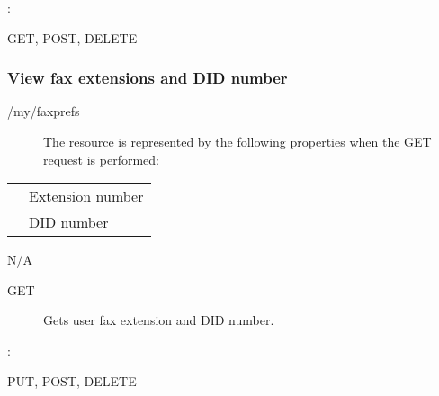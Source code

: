 \documentclass[letterpaper,10pt,english]{sphinxmanual}
\begin{document}
:

\begin{sphinxVerbatim}[commandchars=\\\{\}]
\end{sphinxVerbatim}

 GET, POST, DELETE


\subsubsection{View fax extensions and DID number}
\label{\detokenize{restapi:view-fax-extensions-and-did-number}}
 /my/faxprefs
\begin{description}
\item[{}] \leavevmode
The resource is represented by the following properties when the GET request is performed:

\end{description}


\begin{savenotes}\sphinxattablestart
\centering
\begin{tabulary}{\linewidth}[t]{|T|T|}
\hline

&
\\
\hline
{}
&
Extension number
\\
\hline
{}
&
DID number
\\
\hline
\end{tabulary}
\par
\sphinxattableend\end{savenotes}

 N/A
\begin{description}
\item[{ GET}] \leavevmode
Gets user fax extension and DID number.

\end{description}

:

\begin{sphinxVerbatim}[commandchars=\\\{\}]
\end{sphinxVerbatim}

 PUT, POST, DELETE
\end{document}
